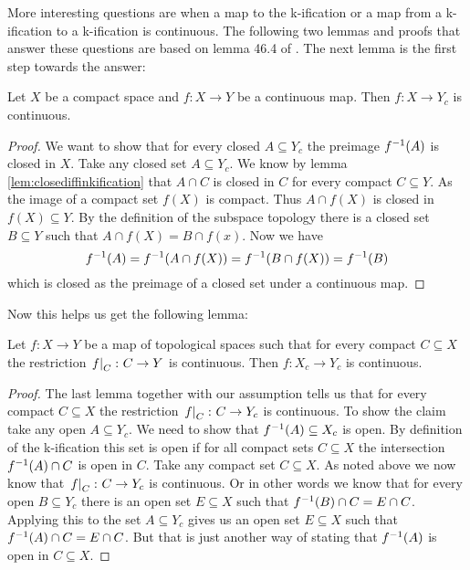 More interesting questions are when a map to the k-ification or a map from a k-ification to a k-ification is continuous. 
The following two lemmas and proofs that answer these questions are based on lemma 46.4 of \cite{Munkres2014}.
The next lemma is the first step towards the answer:

\begin{lem}\label{lem:continuoustokification}
    Let $X$ be a compact space and $f \colon X \to Y$ be a continuous map. 
    Then $f \colon X \to Y_c$ is continuous.
\end{lem}
\begin{proof}
    We want to show that for every closed $A \subseteq Y_c$ the preimage $f^{-1}(A)$ is closed in $X$.
    Take any closed set $A \subseteq Y_c$. 
    We know by lemma \ref{lem:closediffinkification} that $A \cap C$ is closed in $C$ for every compact $C \subseteq Y$.
    As the image of a compact set $f(X)$ is compact. 
    Thus $A \cap f(X)$ is closed in $f(X) \subseteq Y$. 
    By the definition of the subspace topology there is a closed set $B \subseteq Y$ such that $A \cap f(X) = B \cap f(x)$. 
    Now we have 
    \[f^{-1}(A) = f^{-1}(A \cap f(X)) = f^{-1}(B \cap f(X)) = f^{-1}(B)\]
    which is closed as the preimage of a closed set under a continuous map.
\end{proof}

Now this helps us get the following lemma:

\begin{lem}
    Let $f \colon X \to Y$ be a map of topological spaces such that for every compact $C \subseteq X$ the restriction $\left.f\right|_{C} \colon C \to Y$ is continuous.
    Then $f \colon X_c \to Y_c$ is continuous.
\end{lem}
\begin{proof}
    The last lemma together with our assumption tells us that for every compact $C \subseteq X$ the restriction $\left.f\right|_{C} \colon C \to Y_c$ is continuous.
    To show the claim take any open $A \subseteq Y_c$.
    We need to show that $f^{-1}(A) \subseteq X_c$ is open. 
    By definition of the k-ification this set is open if for all compact sets $C \subseteq X$ the intersection $f^{-1}(A) \cap C$ is open in $C$. 
    Take any compact set $C \subseteq X$. 
    As noted above we now know that $\left.f\right|_{C} \colon C \to Y_c$ is continuous.
    Or in other words we know that for every open $B \subseteq Y_c$ there is an open set $E \subseteq X$ such that $f^{-1}(B) \cap C = E \cap C$.
    Applying this to the set $A \subseteq Y_c$ gives us an open set $E \subseteq X$ such that $f^{-1}(A) \cap C = E \cap C$.
    But that is just another way of stating that $f^{-1}(A)$ is open in $C \subseteq X$.
\end{proof}

